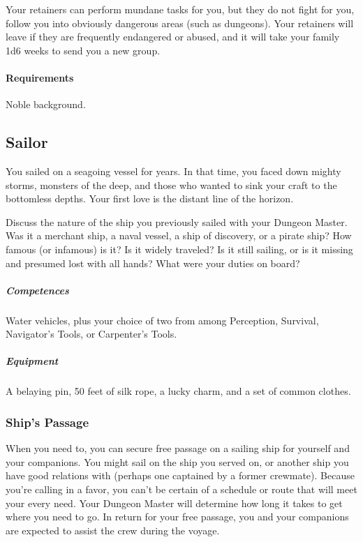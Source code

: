            Your retainers can perform mundane tasks for you, but they do not fight for you, follow you into obviously dangerous areas (such as dungeons).
            Your retainers will leave if they are frequently endangered or abused, and it will take your family 1d6 weeks to send you a new group.
            \paragraph{Requirements} Noble background.
\subsection*{Sailor} \label{ssec::sailor}
    You sailed on a seagoing vessel for years.
    In that time, you faced down mighty storms, monsters of the deep, and those who wanted to sink your craft to the bottomless depths.
    Your first love is the distant line of the horizon.

    Discuss the nature of the ship you previously sailed with your Dungeon Master.
    Was it a merchant ship, a naval vessel, a ship of discovery, or a pirate ship?
    How famous (or infamous) is it?
    Is it widely traveled?
    Is it still sailing, or is it missing and presumed lost with all hands?
    What were your duties on board?

    \subparagraph{Competences} Water vehicles, plus your choice of two from among Perception, Survival, Navigator's Tools, or Carpenter's Tools.

    \subparagraph{Equipment} A belaying pin, 50 feet of silk rope, a lucky charm, and a set of common clothes.

    \subsubsection{Ship's Passage}
        When you need to, you can secure free passage on a sailing ship for yourself and your companions.
        You might sail on the ship you served on, or another ship you have good relations with (perhaps one captained by a former crewmate).
        Because you're calling in a favor, you can't be certain of a schedule or route that will meet your every need.
        Your Dungeon Master will determine how long it takes to get where you need to go.
        In return for your free passage, you and your companions are expected to assist the crew during the voyage.

